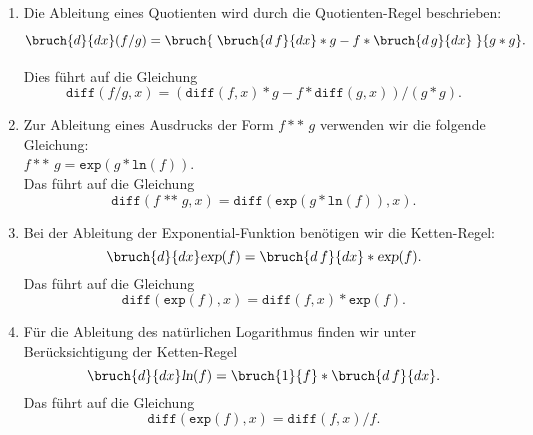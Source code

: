\begin{enumerate}
\item Die Ableitung eines Quotienten wird durch die Quotienten-Regel beschrieben: 
      \[ \bruch{d}{dx}(f/g) = \bruch{\;\displaystyle \rule[-10pt]{0pt}{12pt}
         \bruch{d\,f}{dx}*g - f*\bruch{d\,g}{dx}\;}{\displaystyle \rule{0pt}{10pt}g*g}. \]
      Dies f\"{u}hrt auf die Gleichung 
      \[ \texttt{diff}(f/g,x) = (\texttt{diff}(f,x) * g - f * \texttt{diff}(g,x)) / (g*g). \]
\item Zur Ableitung eines Ausdrucks der Form $f \,\mathtt{**}\, g$ verwenden wir die folgende Gleichung:
      \\[0.2cm]
      \hspace*{1.3cm}      
      $f \,\mathtt{**}\, g = \texttt{exp}(g*\texttt{ln}(f))$.
      \\[0.2cm]
      Das f\"{u}hrt auf die Gleichung 
      \[ 
         \texttt{diff}(f \;\texttt{**}\; g, x) = 
         \texttt{diff}(\mathtt{exp}(g * \mathtt{ln}(f)), x). 
      \]
\item Bei der Ableitung der Exponential-Funktion ben\"{o}tigen wir die Ketten-Regel:
      \[ \bruch{d}{dx}\textsl{exp}(f) = \bruch{d\,f}{dx}* \textsl{exp}(f). \]
      Das f\"{u}hrt auf die Gleichung 
      \[ \texttt{diff}(\texttt{exp}(f), x) = \texttt{diff}(f,x) * \texttt{exp}(f). \]
\item F\"{u}r die Ableitung des nat\"{u}rlichen Logarithmus finden wir unter Ber\"{u}cksichtigung der Ketten-Regel
      \[ \bruch{d}{dx}\textsl{ln}(f) = \bruch{1}{f}*\bruch{d\,f}{dx}. \]
      Das f\"{u}hrt auf die Gleichung 
      \[ \texttt{diff}(\texttt{exp}(f), x) = \texttt{diff}(f,x)/f. \]
\end{enumerate}

